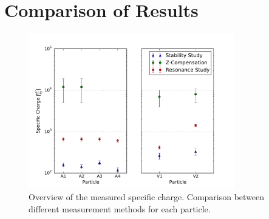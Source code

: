 \documentclass[
	paper=A4,
	parskip=full,
	chapterprefix=true,
	11pt,
	headings=normal,
	bibliography=totoc,
	listof=totoc,
	titlepage=on,
]{scrreprt}
\begin{document}
\chapter{Comparison of Results}


\begin{figure}[t]
	\centering
	\includegraphics[width=0.8\textwidth]{paul_compareresults}
	\caption{Overview of the measured specific charge. Comparison between different measurement methods for each particle.}
	\label{fig:comp_results}
\end{figure}	

\cleardoublepage


{}
\end{document}
